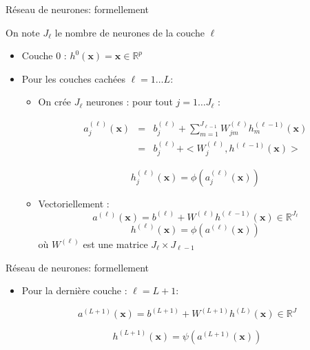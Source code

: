 \documentclass[ignorenonframetext,]{beamer}
\begin{document}
\begin{frame}{Réseau de neurones: formellement}

On note \(J_{\ell}\) le nombre de neurones de la couche \(\ell\)

\begin{itemize}
\item
  Couche \(0\) : \(h^0(\mathbf{x}) = \mathbf{x} \in \mathbb{R}^p\)
\item
  Pour les couches cachées \(\ell = 1\dots L\):

  \begin{itemize}
  \item
    On crée \(J_{\ell}\) neurones : pour tout \(j = 1 \dots J_{\ell}\) :

    \begin{eqnarray*}
    a^{(\ell)}_j(\mathbf{x}) &=& b^{(\ell)}_j + \sum_{m=1}^{J_{\ell-1}} W^{(\ell)}_{jm} h_m^{(\ell-1)}(\mathbf{x}) \\
    &=& b^{(\ell)}_j + < W^{(\ell)}_{j},  h ^{(\ell-1)}(\mathbf{x}) >
    \end{eqnarray*}

    \[h_j^{(\ell)}(\mathbf{x}) = \phi(a_j^{(\ell)}(\mathbf{x}))\]
  \item
    Vectoriellement :
    \[a^{(\ell)}(\mathbf{x}) = b^{(\ell)} +W^{(\ell)} h^{(\ell-1)}(\mathbf{x}) \in \mathbb{R}^{J_{\ell}}\]
    \[h^{(\ell)}(\mathbf{x}) = \phi(a^{(\ell)}(\mathbf{x}))\] où
    \(W^{(\ell)}\) est une matrice \(J_{\ell} \times J_{\ell-1}\)
  \end{itemize}
\end{itemize}

\end{frame}

\begin{frame}{Réseau de neurones: formellement}

\begin{itemize}
\item
  Pour la dernière couche : \(\ell = L+1\):

  \[a^{(L+1)}(\mathbf{x}) = b^{(L+1)} +W^{(L+1)} h^{(L)}(\mathbf{x}) \in \mathbb{R}^J\]

  \[h^{(L+1)}(\mathbf{x}) = \psi(a^{(L+1)}(\mathbf{x}))\]
\end{itemize}

\end{frame}
\end{document}
